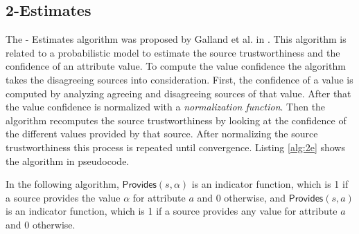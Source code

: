 \documentclass{acm_proc_article-sp}
\begin{document}
\subsection{2-Estimates}
The {- Estimates} algorithm was proposed by Galland et al. in \cite{galland:corro}. This algorithm is related to a probabilistic model to estimate the source trustworthiness and the confidence of an attribute value. To compute the value confidence the algorithm takes the disagreeing sources into consideration. First, the confidence of a value is computed by analyzing agreeing and disagreeing sources of that value. After that the value confidence is normalized with a \emph{normalization function}. Then the algorithm recomputes the source trustworthiness by looking at the confidence of the different values provided by that source. After normalizing the source trustworthiness this process is repeated until convergence. Listing \ref{alg:2e} shows the algorithm in pseudocode.

In the following algorithm, $\mathsf{Provides}(s,\alpha)$ is an indicator function, which is 1 if a source provides the value $\alpha$ for attribute $a$ and 0 otherwise, and $\mathsf{Provides}(s,a)$ is an indicator function, which is 1 if a source provides any value for attribute $a$ and 0 otherwise. 
\end{document}
